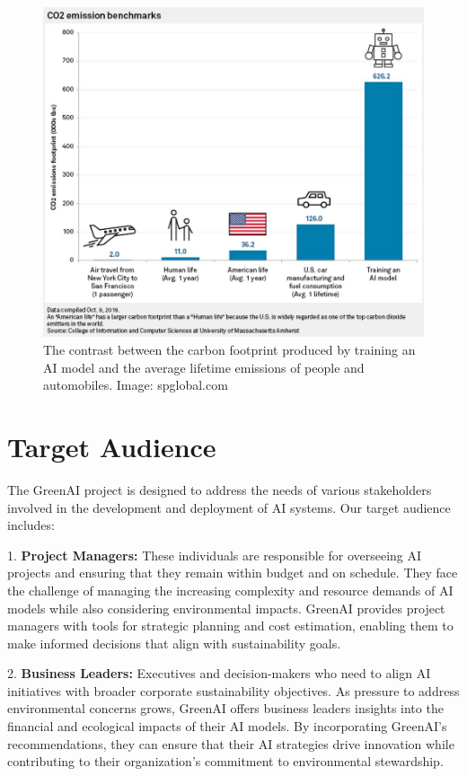 \documentclass{report}
\begin{document}
\begin{figure}[h!]
    \centering
    \includegraphics[width=\textwidth]{1.png}
    \caption{The contrast between the carbon footprint produced by training an AI model and the average lifetime emissions of people and automobiles. Image: spglobal.com}
    \label{fig:carbon_footprint}
\end{figure}

\section{Target Audience}

The GreenAI project is designed to address the needs of various stakeholders involved in the development and deployment of AI systems. Our target audience includes:

1. \textbf{Project Managers:} These individuals are responsible for overseeing AI projects and ensuring that they remain within budget and on schedule. They face the challenge of managing the increasing complexity and resource demands of AI models while also considering environmental impacts. GreenAI provides project managers with tools for strategic planning and cost estimation, enabling them to make informed decisions that align with sustainability goals.

2. \textbf{Business Leaders:} Executives and decision-makers who need to align AI initiatives with broader corporate sustainability objectives. As pressure to address environmental concerns grows, GreenAI offers business leaders insights into the financial and ecological impacts of their AI models. By incorporating GreenAI’s recommendations, they can ensure that their AI strategies drive innovation while contributing to their organization’s commitment to environmental stewardship.
\end{document}

